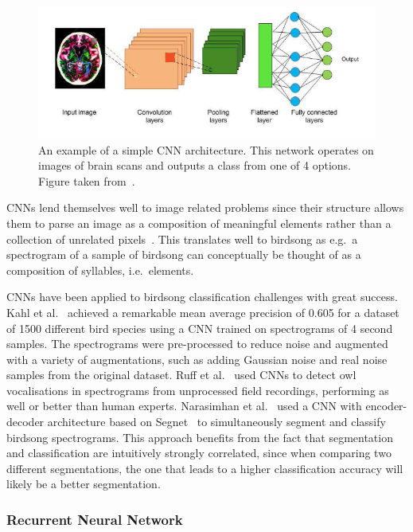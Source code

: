 \begin{figure}[ht]
  \centering
  \includegraphics[width=\textwidth]{figures/cnn_example.png}
  \caption{An example of a simple CNN architecture. This network operates on
  images of brain scans and outputs a class from one of 4 options. Figure taken
from~\cite{sarvamangala2022convolutional}.}\label{fig:cnn_example}
\end{figure}

CNNs lend themselves well to image related problems since their structure allows
them to parse an image as a composition of meaningful elements rather than a
collection of unrelated pixels~\cite{lecun2015deep}. This translates well to
birdsong as e.g.\ a spectrogram of a sample of birdsong can conceptually be
thought of as a composition of syllables, i.e.\ elements.

CNNs have been applied to birdsong classification challenges with great success.
Kahl et al.~\cite{kahl2017large} achieved a remarkable mean average precision of
0.605 for a dataset of 1500 different bird species using a CNN trained on
spectrograms of 4 second samples. The spectrograms were pre-processed to reduce
noise and augmented with a variety of augmentations, such as adding Gaussian
noise and real noise samples from the original dataset. Ruff et
al.~\cite{ruff2020automated} used CNNs to detect owl vocalisations in
spectrograms from unprocessed field recordings, performing as well or better
than human experts. Narasimhan et al.~\cite{narasimhan2017simultaneous} used a
CNN with encoder-decoder architecture based on
Segnet~\cite{badrinarayanan2017segnet} to simultaneously segment and classify
birdsong spectrograms. This approach benefits from the fact that segmentation
and classification are intuitively strongly correlated, since when comparing
two different segmentations, the one that leads to a higher classification
accuracy will likely be a better segmentation.

\subsubsection{Recurrent Neural Network}

